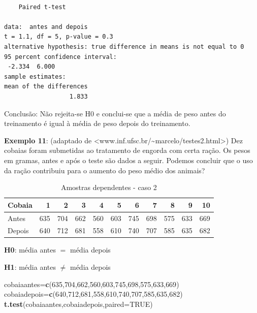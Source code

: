 \documentclass[12pt,brazil,]{book}
\newenvironment{Shaded}{\begin{snugshade}}{\end{snugshade}}
\newcommand{\DataTypeTok}[1]{\textcolor[rgb]{0.13,0.29,0.53}{#1}}
\newcommand{\DecValTok}[1]{\textcolor[rgb]{0.00,0.00,0.81}{#1}}
\newcommand{\KeywordTok}[1]{\textcolor[rgb]{0.13,0.29,0.53}{\textbf{#1}}}
\newcommand{\NormalTok}[1]{#1}
\newcommand{\OtherTok}[1]{\textcolor[rgb]{0.56,0.35,0.01}{#1}}
\begin{document}
\begin{verbatim}

    Paired t-test

data:  antes and depois
t = 1.1, df = 5, p-value = 0.3
alternative hypothesis: true difference in means is not equal to 0
95 percent confidence interval:
 -2.334  6.000
sample estimates:
mean of the differences 
                  1.833 
\end{verbatim}

Conclusão: Não rejeita-se H0 e conclui-se que a média de peso antes do
treinamento é igual à média de peso depois do treinamento.

\textbf{Exemplo 11}: (adaptado de
\textless{}www.inf.ufsc.br/\textasciitilde{}marcelo/testes2.html\textgreater{})
Dez cobaias foram submetidas ao tratamento de engorda com certa ração.
Os pesos em gramas, antes e após o teste são dados a seguir. Podemos
concluir que o uso da ração contribuiu para o aumento do peso médio dos
animais?

\begin{table}

\caption{\label{tab:unnamed-chunk-110}Amostras dependentes - caso 2}
\centering
\begin{tabular}[t]{l|r|r|r|r|r|r|r|r|r|r}
\hline
Cobaia & 1 & 2 & 3 & 4 & 5 & 6 & 7 & 8 & 9 & 10\\
\hline
Antes & 635 & 704 & 662 & 560 & 603 & 745 & 698 & 575 & 633 & 669\\
\hline
Depois & 640 & 712 & 681 & 558 & 610 & 740 & 707 & 585 & 635 & 682\\
\hline
\end{tabular}
\end{table}

\textbf{H0}: média antes \(=\) média depois

\textbf{H1}: média antes \(\neq\) média depois

\begin{Shaded}
\begin{Highlighting}[]
\NormalTok{cobaiaantes=}\KeywordTok{c}\NormalTok{(}\DecValTok{635}\NormalTok{,}\DecValTok{704}\NormalTok{,}\DecValTok{662}\NormalTok{,}\DecValTok{560}\NormalTok{,}\DecValTok{603}\NormalTok{,}\DecValTok{745}\NormalTok{,}\DecValTok{698}\NormalTok{,}\DecValTok{575}\NormalTok{,}\DecValTok{633}\NormalTok{,}\DecValTok{669}\NormalTok{)}
\NormalTok{cobaiadepois=}\KeywordTok{c}\NormalTok{(}\DecValTok{640}\NormalTok{,}\DecValTok{712}\NormalTok{,}\DecValTok{681}\NormalTok{,}\DecValTok{558}\NormalTok{,}\DecValTok{610}\NormalTok{,}\DecValTok{740}\NormalTok{,}\DecValTok{707}\NormalTok{,}\DecValTok{585}\NormalTok{,}\DecValTok{635}\NormalTok{,}\DecValTok{682}\NormalTok{)}
\KeywordTok{t.test}\NormalTok{(cobaiaantes,cobaiadepois,}\DataTypeTok{paired=}\OtherTok{TRUE}\NormalTok{)}
\end{Highlighting}
\end{Shaded}
\end{document}
